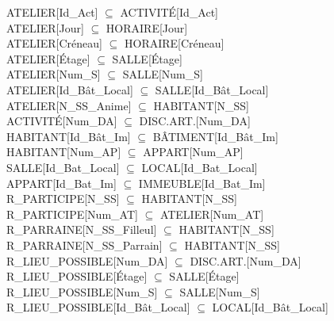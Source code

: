 \documentclass[a4paper,10.5pt]{report}
\begin{document}
	ATELIER[Id\_Act] $\subseteq$ ACTIVITÉ[Id\_Act] \\

	ATELIER[Jour] $\subseteq$ HORAIRE[Jour] \\

	ATELIER[Créneau] $\subseteq$ HORAIRE[Créneau] \\

	ATELIER[Étage] $\subseteq$ SALLE[Étage] \\

	ATELIER[Num\_S] $\subseteq$ SALLE[Num\_S] \\

	ATELIER[Id\_Bât\_Local] $\subseteq$ SALLE[Id\_Bât\_Local] \\

	ATELIER[N\_SS\_Anime] $\subseteq$ HABITANT[N\_SS] \\

	ACTIVITÉ[Num\_DA] $\subseteq$ DISC.ART.[Num\_DA] \\

	HABITANT[Id\_Bât\_Im] $\subseteq$ BÂTIMENT[Id\_Bât\_Im] \\

	HABITANT[Num\_AP] $\subseteq$ APPART[Num\_AP] \\

	SALLE[Id\_Bat\_Local] $\subseteq$ LOCAL[Id\_Bat\_Local] \\

	APPART[Id\_Bat\_Im] $\subseteq$ IMMEUBLE[Id\_Bat\_Im] \\

	R\_PARTICIPE[N\_SS]  $\subseteq$ HABITANT[N\_SS] \\

	R\_PARTICIPE[Num\_AT] $\subseteq$ ATELIER[Num\_AT] \\

	R\_PARRAINE[N\_SS\_Filleul] $\subseteq$ HABITANT[N\_SS] \\

	R\_PARRAINE[N\_SS\_Parrain] $\subseteq$ HABITANT[N\_SS] \\

	R\_LIEU\_POSSIBLE[Num\_DA] $\subseteq$ DISC.ART.[Num\_DA] \\

	R\_LIEU\_POSSIBLE[Étage] $\subseteq$ SALLE[Étage] \\

	R\_LIEU\_POSSIBLE[Num\_S] $\subseteq$ SALLE[Num\_S] \\

	R\_LIEU\_POSSIBLE[Id\_Bât\_Local] $\subseteq$ LOCAL[Id\_Bât\_Local] \\
\end{document}
